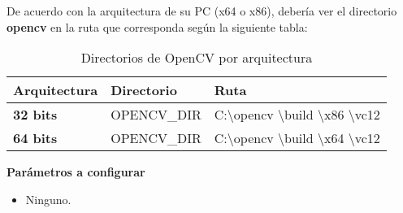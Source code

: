 De acuerdo con la arquitectura de su PC (x64 o x86), debería ver el directorio \textbf{opencv}
en la ruta que corresponda según la siguiente tabla:
\begin{longtable}{ | p{5.5cm} | p{5.5cm} | p{5.5cm} | }
	\caption{Directorios de OpenCV por arquitectura}
	\label{table:opencvarquitectura}
	\\	\hline
		 \textbf{Arquitectura} &\textbf{Directorio}&\textbf{Ruta}
		\\ \hline
        \textbf{32 bits}&OPENCV\_DIR&C:\textbackslash{opencv} \textbackslash{build} \textbackslash{x86} \textbackslash{vc12}
        \\ \hline
        \textbf{64 bits}&OPENCV\_DIR&C:\textbackslash{opencv} \textbackslash{build} \textbackslash{x64} \textbackslash{vc12}
        \\ \hline
\end{longtable}
\textbf{Parámetros a configurar}
\begin{itemize}
    \item Ninguno.
\end{itemize}   
 
